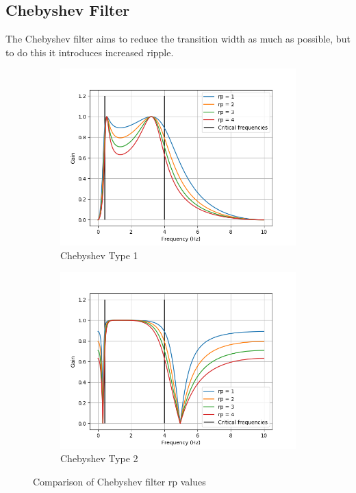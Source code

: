 \documentclass[12pt,a4paper,twoside,openany]{report}
\begin{document}
\subsection{Chebyshev Filter}

The Chebyshev filter aims to reduce the transition width as much as possible,
but to do this it introduces increased ripple.

\begin{figure}[h]
\begin{subfigure}{.5\textwidth}
  \centering
  \includegraphics[width=\linewidth]{figs/cheby1-rp-comparison.png}
  \caption{Chebyshev Type 1}
  \label{fig:cheby1rs}
\end{subfigure}%
\begin{subfigure}{.5\textwidth}
  \centering
  \includegraphics[width=\linewidth]{figs/cheby2-rp-comparison.png}
  \caption{Chebyshev Type 2}
  \label{fig:cheby2rs}
\end{subfigure}
\caption{Comparison of Chebyshev filter rp values}
\label{fig:chebyrp}
\end{figure}
\end{document}
